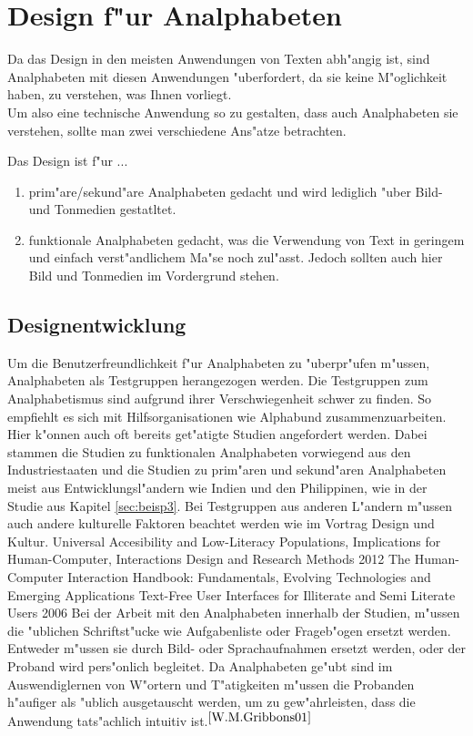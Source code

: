 \section{Design f"ur Analphabeten}
Da das Design in den meisten Anwendungen von Texten abh"angig ist, sind Analphabeten mit diesen Anwendungen "uberfordert, da sie keine M"oglichkeit haben, zu verstehen, was Ihnen vorliegt. \\
Um also eine technische Anwendung so zu gestalten, dass auch Analphabeten sie verstehen, sollte man zwei verschiedene Ans"atze betrachten.

Das Design ist f"ur ...
\begin{enumerate}
	\item prim"are/sekund"are Analphabeten gedacht und wird lediglich "uber Bild- und Tonmedien gestatltet.
	\item funktionale Analphabeten gedacht, was die Verwendung von Text in geringem und einfach verst"andlichem Ma"se noch zul"asst. Jedoch sollten auch hier Bild und Tonmedien im Vordergrund stehen.
\end{enumerate}

\subsection{Designentwicklung}\label{sec:designEval}
Um die Benutzerfreundlichkeit f"ur Analphabeten zu "uberpr"ufen m"ussen, Analphabeten als Testgruppen herangezogen werden. Die Testgruppen zum Analphabetismus sind aufgrund ihrer Verschwiegenheit schwer zu finden. So empfiehlt es sich mit  Hilfsorganisationen wie \glqq Alphabund\grqq{}  zusammenzuarbeiten. Hier k"onnen auch oft bereits get"atigte Studien angefordert werden. Dabei stammen die Studien zu funktionalen Analphabeten vorwiegend aus den Industriestaaten und die Studien zu prim"aren und sekund"aren Analphabeten meist aus Entwicklungsl"andern wie Indien und den Philippinen,  wie in der Studie aus Kapitel \ref{sec:beisp3}. Bei Testgruppen aus anderen L"andern m"ussen auch andere kulturelle Faktoren beachtet werden wie im Vortrag \glqq Design und Kultur\grqq{}.  
					{Universal Accesibility and Low-Literacy Populations, Implications for Human-Computer, Interactions Design and Research Methods}
					{2012}
					{The Human-Computer Interaction Handbook: Fundamentals, Evolving Technologies and Emerging Applications}
					{Text-Free User Interfaces for Illiterate and Semi Literate Users}
					{2006}{}
Bei der Arbeit mit den Analphabeten innerhalb der Studien, m"ussen die "ublichen Schriftst"ucke wie Aufgabenliste oder Frageb"ogen ersetzt werden. Entweder m"ussen sie durch Bild- oder Sprachaufnahmen ersetzt werden, oder der Proband wird pers"onlich begleitet.
Da Analphabeten ge"ubt sind im Auswendiglernen von W"ortern und T"atigkeiten m"ussen die Probanden h"aufiger als "ublich ausgetauscht werden, um zu gew"ahrleisten, dass die Anwendung tats"achlich intuitiv ist.$^{\ref{W.M.Gribbons01}}$\\
\newpage

